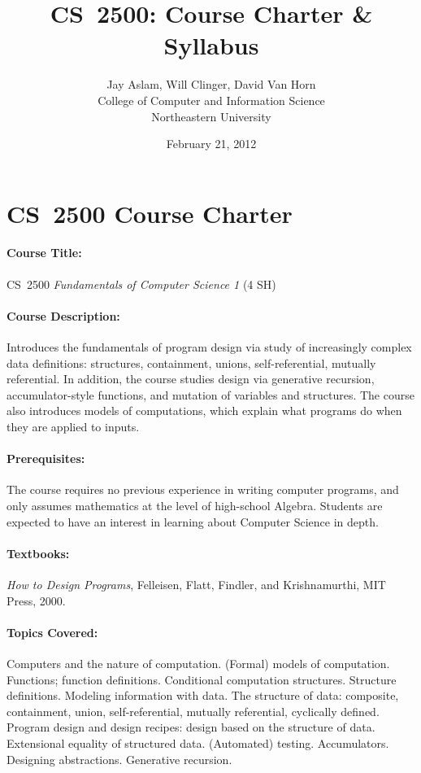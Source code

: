 \documentclass[11pt]{article}
\title{CS~2500: Course Charter \& Syllabus}
\author{Jay Aslam, Will Clinger, David Van Horn \\
        College of Computer and Information Science \\
        Northeastern University}
\date{February 21, 2012}
\begin{document}
\maketitle

\section{CS~2500 Course Charter}

\paragraph{Course Title:}
%
CS~2500 \emph{Fundamentals of Computer Science 1} (4 SH)

\paragraph{Course Description:}
%
Introduces the fundamentals of program design via study of increasingly
complex data definitions: structures, containment, unions, self-referential,
mutually referential. In addition, the course studies design via generative
recursion, accumulator-style functions, and mutation of variables and
structures. The course also introduces models of computations, which explain
what programs do when they are applied to inputs.

\paragraph{Prerequisites:}
%
The course requires no previous experience in writing computer programs, and
only assumes mathematics at the level of high-school Algebra. Students are
expected to have an interest in learning about Computer Science in depth.

\paragraph{Textbooks:}
%
\emph{How to Design Programs}, Felleisen, Flatt, Findler, and Krishnamurthi, 
MIT Press, 2000.

\paragraph{Topics Covered:}
%
Computers and the nature of computation. (Formal) models of computation.
Functions; function definitions. Conditional computation structures. Structure
definitions. Modeling information with data. The structure of data:
composite, containment, union, self-referential, mutually referential,
cyclically defined. Program design and design recipes: design based on the
structure of data. Extensional equality of structured data. (Automated) testing.
Accumulators. Designing abstractions. Generative recursion.
\end{document}
